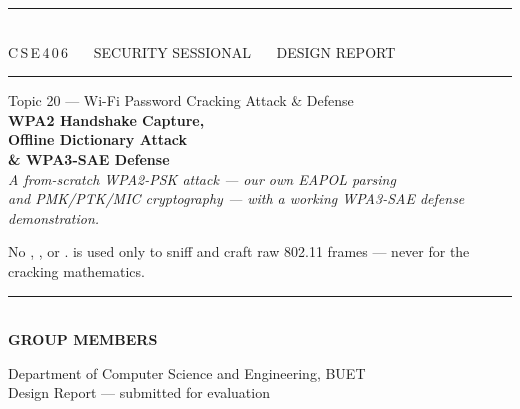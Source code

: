 


\thispagestyle{empty}

\begin{center}
\vspace*{1.4cm}
{\color{rule}\rule{\textwidth}{1.4pt}}\\[4pt]
{\sffamily\footnotesize\color{inksoft}%
 \MakeUppercase{\hspace{0.15em}C\,S\,E\,4\,0\,6 \ \textbullet\ \ Security Sessional \ \textbullet\ \ Design Report}}\\[6pt]
{\color{rule}\rule{\textwidth}{0.6pt}}

\vspace{2.2cm}
{\sffamily\color{accent}\large Topic 20 --- Wi-Fi Password Cracking Attack \& Defense}\\[1.0cm]
{\bfseries\fontsize{27}{31}\selectfont WPA2 Handshake Capture,}\\[4pt]
{\bfseries\fontsize{27}{31}\selectfont Offline Dictionary Attack}\\[4pt]
{\bfseries\fontsize{27}{31}\selectfont \& WPA3-SAE Defense}\\[0.9cm]
{\large\itshape\color{inksoft} A from-scratch WPA2-PSK attack --- our own EAPOL parsing\\[2pt]
 and PMK/PTK/MIC cryptography --- with a working WPA3-SAE defense demonstration.}\\[10pt]
\begin{minipage}{0.82\textwidth}\centering\small\color{inksoft}
No , ,  or .  is used only to
sniff and craft raw 802.11 frames --- never for the cracking mathematics.
\end{minipage}

\vspace{2.4cm}
{\color{rule}\rule{0.5\textwidth}{0.6pt}}\\[10pt]
{\sffamily\small\bfseries\color{ink}GROUP MEMBERS}\\[8pt]
\groupmembers

\vspace{1.0cm}
\supervisorblock

\vfill
{\sffamily\footnotesize\color{inksoft}Department of Computer Science and Engineering, BUET \\[2pt]
Design Report --- submitted for evaluation}
\end{center}
\clearpage

